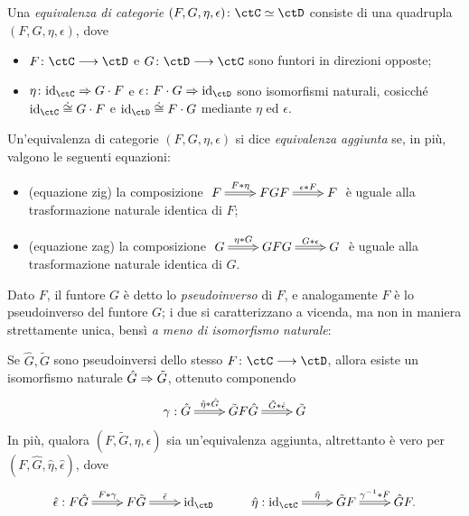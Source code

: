 \begin{definition}\label{funtore_equcat}
 Una \emph{equivalenza di categorie} \((F,G,\eta,\epsilon)\colon\ctC\simeq\ctD\) consiste di una quadrupla \((F,G,\eta,\epsilon)\), dove
 \begin{itemize}
  \item \(F \colon \ctC\fun\ctD\) e \(G \colon \ctD\fun\ctC\) sono funtori in direzioni opposte;
  \item \(\eta \colon \Id[\ctC] \nat G\cmp F\) e \(\epsilon \colon F\cmp G \nat \Id[\ctD]\) sono isomorfismi naturali, cosicché \(\Id[\ctC]\natIso G\cmp F\) e \(\Id[\ctD]\natIso F\cmp G\) mediante \(\eta\) ed \(\epsilon\).
 \end{itemize}
 Un'equivalenza di categorie \((F,G,\eta,\epsilon)\) si dice \emph{equivalenza aggiunta} se, in più, valgono le seguenti equazioni:
 \begin{itemize}
  \item (equazione zig) la composizione \(\xymatrix{F \ar@{=>}[r]^-{F\whi\eta} & FGF \ar@{=>}[r]^-{\epsilon\whi F} & F}\) è uguale alla trasformazione naturale identica di \(F\);
  \item (equazione zag) la composizione \(\xymatrix{G \ar@{=>}[r]^-{\eta\whi G} & GFG \ar@{=>}[r]^-{G\whi\epsilon} & G}\) è uguale alla trasformazione naturale identica di \(G\).
 \end{itemize}
 Dato \(F\), il funtore \(G\) è detto lo \emph{pseudoinverso} di \(F\), e analogamente \(F\) è lo pseudoinverso del funtore \(G\); i due si caratterizzano a vicenda, ma non in maniera strettamente unica, bensì \emph{a meno di isomorfismo naturale}:
 \begin{lemma}
  Se \(\hat G,\tilde G\) sono pseudoinversi dello stesso \(F \colon \ctC\fun\ctD\), allora esiste un isomorfismo naturale \(\hat G\Rightarrow \tilde G\), ottenuto componendo
  \[\xymatrix{\gamma : \hat G \ar@{=>}[r]^-{\tilde\eta\whi\hat G } & \tilde G F \hat G \ar@{=>}[r]^-{\tilde G \whi \hat\epsilon} & \tilde G}\]
  In più, qualora \((F, \tilde G,\eta,\epsilon)\) sia un'equivalenza aggiunta, altrettanto è vero per \((F, \hat G,\hat\eta,\hat\epsilon)\), dove
  \[\xymatrix{
   \hat\epsilon : F\hat G \ar@{=>}[r]^-{F\whi \gamma} & F\tilde G \ar@{=>}[r]^-{\tilde\epsilon} & \Id[\ctD] & \hat\eta : \Id[\ctC] \ar@{=>}[r]^-{\tilde\eta} & \tilde GF \ar@{=>}[r]^-{\gamma^{-1}\whi F} & \hat G F.
   }\]
 \end{lemma}
\end{definition}

